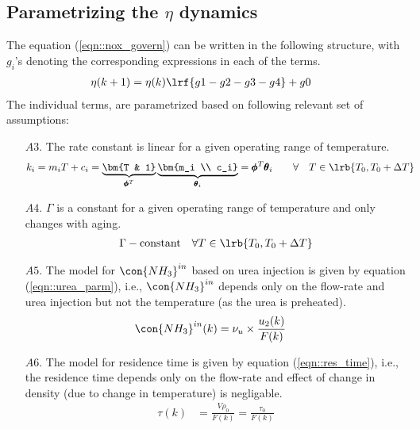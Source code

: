 \subsection{Parametrizing the $\eta$ dynamics}
The equation (\ref{eqn::nox_govern}) can be written in the following structure, with $g_i$'s denoting the corresponding expressions in each of the terms.
\begin{align}
        \eta(k+1) &= \eta(k) \lrf{ g1 - g2 -g3 -g4} + g0
\end{align}
The individual terms, are parametrized based on following relevant set of assumptions:
\begin{itemize}
        \item[$A3.$] The rate constant is linear for a given operating range of temperature.
        \begin{align}
                k_i &= m_i T + c_i = \underbrace{\bm{T & 1}}_{\pmb \phi^T} \underbrace{\bm{m_i \\ c_i}}_{\pmb \theta_i}
                        = \pmb \phi^{T} \pmb \theta_i
                \qquad \forall \quad T \in \lrb{T_0, T_0 + \Delta T}
                \label{eqn::k_mdl}
        \end{align}
        \item[$A4.$] $\Gamma$ is a constant for a given operating range of temperature and only changes with aging.
        \begin{align}
                \Gamma - \text{constant} \quad \forall T \in \lrb{T_0, T_0 + \Delta T}
                \label{eqn::gamma_mdl}
        \end{align}
        \item[$A5.$] The model for $\con{NH_3}^{in}$ based on urea injection is given by equation (\ref{eqn::urea_parm}), i.e., $\con{NH_3}^{in}$ depends only on the flow-rate and urea injection but not the temperature (as the urea is preheated).
        \begin{align}
                \con{NH_3}^{in}(k) &= \nu_u \times \frac{u_2(k)}{F(k)}
                \label{eqn::urea_mdl}
        \end{align}
        \item[$A6.$] The model for residence time is given by equation (\ref{eqn::res_time}), i.e., the residence time depends only on the flow-rate and effect of change in density (due to change in temperature) is negligable.
        \begin{align}
                \tau(k) &= \frac{V \rho_0}{F(k)} = \frac{\tau_0}{F(k)}
                \label{eqn::residence_time_mdl}
        \end{align}
\end{itemize}

